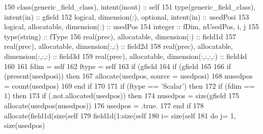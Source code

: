 \begin{DoxyCode}
150     \textcolor{keywordtype}{class}(generic\_field\_class), \textcolor{keywordtype}{intent(inout)} :: self
151     \textcolor{keywordtype}{type}(generic\_field\_class), \textcolor{keywordtype}{intent(in)} :: gfield
152     \textcolor{keywordtype}{logical}, \textcolor{keywordtype}{dimension(:)}, \textcolor{keywordtype}{optional}, \textcolor{keywordtype}{intent(in)} :: usedPosi 
153     \textcolor{keywordtype}{logical}, \textcolor{keywordtype}{allocatable}, \textcolor{keywordtype}{dimension(:)} :: usedPos
154     \textcolor{keywordtype}{integer} :: fDim, nUsedPos, i, j
155     \textcolor{keywordtype}{type}(string) :: fType
156     \textcolor{keywordtype}{real(prec)}, \textcolor{keywordtype}{allocatable}, \textcolor{keywordtype}{dimension(:)} :: field1d
157     \textcolor{keywordtype}{real(prec)}, \textcolor{keywordtype}{allocatable}, \textcolor{keywordtype}{dimension(:,:)} :: field2d
158     \textcolor{keywordtype}{real(prec)}, \textcolor{keywordtype}{allocatable}, \textcolor{keywordtype}{dimension(:,:,:)} :: field3d
159     \textcolor{keywordtype}{real(prec)}, \textcolor{keywordtype}{allocatable}, \textcolor{keywordtype}{dimension(:,:,:,:)} :: field4d
160 
161     fdim = self%
162     ftype = self%
163     \textcolor{keywordflow}{if} (gfield%
164     \textcolor{keywordflow}{if} (gfield%
165     
166     \textcolor{keywordflow}{if} (\textcolor{keyword}{present}(usedposi)) \textcolor{keywordflow}{then}
167         \textcolor{keyword}{allocate}(usedpos, source = usedposi)
168         nusedpos = count(usedpos)
169 \textcolor{keywordflow}{    end if}
170     
171     \textcolor{keywordflow}{if} (ftype == \textcolor{stringliteral}{'Scalar'}) \textcolor{keywordflow}{then}
172         \textcolor{keywordflow}{if} (fdim == 1) \textcolor{keywordflow}{then}
173             \textcolor{keywordflow}{if} (.not.\textcolor{keyword}{allocated}(usedpos)) \textcolor{keywordflow}{then}
174                 nusedpos = \textcolor{keyword}{size}(gfield%
175                 \textcolor{keyword}{allocate}(usedpos(nusedpos))
176                 usedpos = .true.
177 \textcolor{keywordflow}{            end if}
178             \textcolor{keyword}{allocate}(field1d(\textcolor{keyword}{size}(self%
179             field1d(1:\textcolor{keyword}{size}(self%
180             i= \textcolor{keyword}{size}(self%
181             \textcolor{keywordflow}{do} j= 1, \textcolor{keyword}{size}(usedpos)

\end{DoxyCode}

